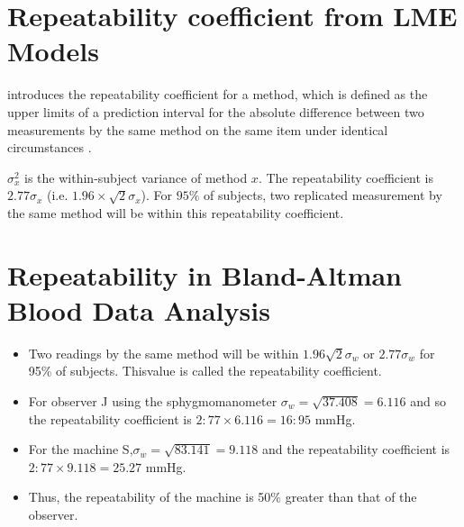 \documentclass[12pt, a4paper]{report}
\theoremstyle{plain}
\theoremstyle{definition}
\theoremstyle{remark}
\begin{document}
	\section{Repeatability coefficient from LME Models}
	\citet{BA99} introduces the repeatability coefficient for a method, which is defined as the upper limits of a prediction interval for the absolute difference between two measurements by the same
	method on the same item under identical circumstances \citep{BXC2008}.
	
	$\sigma^2_{x}$ is the within-subject variance of method $x$. The repeatability coefficient is $2.77 \sigma_{x}$ (i.e. $1.96 \times \sqrt{2} \sigma_{x}$). For $95\%$ of subjects, two replicated measurement by the same method will be within this repeatability coefficient.
	
	
	
	
	\section{Repeatability in Bland-Altman Blood Data Analysis}
	\begin{itemize}
		\item Two readings by the same method will be within $1.96
		\sqrt{2} \sigma_w $ or $2.77 \sigma_w $ for 95\% of subjects. Thisvalue is called the repeatability coefficient.
		
		\item For observer J using the sphygmomanometer $ \sigma_w = \sqrt{37.408} = 6.116$ and so the repeatability coefficient is
		$2:77 \times 6.116 = 16:95$ mmHg.
		
		\item For the machine S,$ \sigma_w = \sqrt{83.141} = 9.118$ and the repeatability coefficient is $2:77 \times 9.118 = 25.27$ mmHg.
		
		\item Thus, the repeatability of the machine is 50\% greater than that of the observer.
	\end{itemize}
\end{document}
